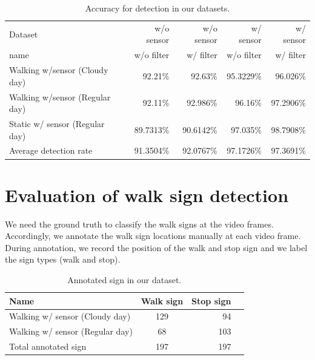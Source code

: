 \begin{table}[h!]
  \centering
  
  \begin{tabular}{  l  r  r r r }
    \rowcolor{gray!50}
    Dataset & w/o sensor & w/o sensor & w/ sensor & w/ sensor \\
    \rowcolor{gray!50}
    name & w/o filter & w/ filter & w/o filter & w/ filter \\
    \hline
    Walking w/sensor (Cloudy day) & 92.21\% & 92.63\% & 95.3229\% & 96.026\% \\
    Walking w/sensor (Regular day) & 92.11\% & 92.986\% & 96.16\% & 97.2906\% \\
    Static w/ sensor (Regular day) & 89.7313\% & 90.6142\% & 97.035\% & 98.7908\% \\
    \hline
    Average detection rate & 91.3504\% & 92.0767\% & 97.1726\% & 97.3691\%\\
  \end{tabular}
  \caption{Accuracy for detection in our datasets.}
  \label{t:acc_stat}
\end{table}

\section{Evaluation of walk sign detection}
We need the ground truth to classify the walk signs at the video frames.
Accordingly, we annotate the walk sign locations manually at each video frame.
During annotation, we record the position of the walk and stop sign and we label the sign types (walk and stop). 

\begin{table}[ht!]
  \centering
  
  \begin{tabular}{  l  c  r r }
    \rowcolor{gray!50}
    Name & Walk sign  & Stop sign \\
    \hline
    Walking w/ sensor (Cloudy day) & 129 & 94 \\ %
    Walking w/ sensor (Regular day) & 68 & 103  \\%
    Total annotated sign & 197 & 197 \\
    \hline
  \end{tabular}
  \caption{Annotated sign in our dataset.}
  \label{t:walk_sign_ann}
\end{table}

